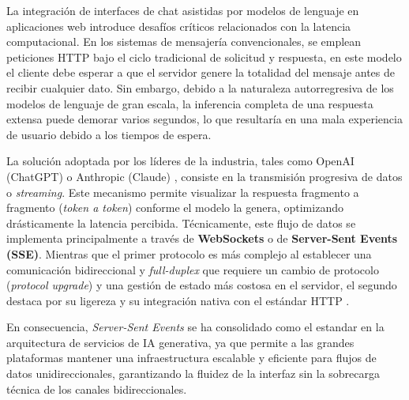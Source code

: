 La integración de interfaces de chat asistidas por modelos de lenguaje en aplicaciones web introduce desafíos críticos relacionados con la latencia computacional. En los sistemas de mensajería convencionales, se emplean peticiones HTTP bajo el ciclo tradicional de solicitud y respuesta, en este modelo el cliente debe esperar a que el servidor genere la totalidad del mensaje antes de recibir cualquier dato. Sin embargo, debido a la naturaleza autorregresiva de los modelos de lenguaje de gran escala, la inferencia completa de una respuesta extensa puede demorar varios segundos, lo que resultaría en una mala experiencia de usuario debido a los tiempos de espera.

La solución adoptada por los líderes de la industria, tales como OpenAI (ChatGPT) o Anthropic (Claude) \cite{openai_streaming_2024}, consiste en la transmisión progresiva de datos o \textit{streaming}. Este mecanismo permite visualizar la respuesta fragmento a fragmento (\textit{token a token}) conforme el modelo la genera, optimizando drásticamente la latencia percibida. Técnicamente, este flujo de datos se implementa principalmente a través de \textbf{WebSockets} o de \textbf{Server-Sent Events (SSE)}. Mientras que el primer protocolo es más complejo al establecer una comunicación bidireccional y \textit{full-duplex} que requiere un cambio de protocolo (\textit{protocol upgrade}) y una gestión de estado más costosa en el servidor, el segundo destaca por su ligereza y su integración nativa con el estándar HTTP \cite{mackovivccomparative}.

En consecuencia, \textit{Server-Sent Events} se ha consolidado como el estandar en la arquitectura de servicios de IA generativa, ya que permite a las grandes plataformas mantener una infraestructura escalable y eficiente para flujos de datos unidireccionales, garantizando la fluidez de la interfaz sin la sobrecarga técnica de los canales bidireccionales.
